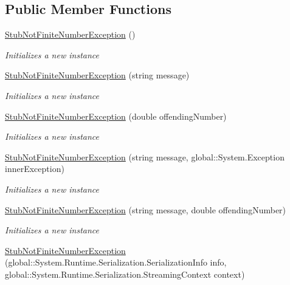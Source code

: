 \subsection*{Public Member Functions}
\begin{DoxyCompactItemize}
\item 
\hyperlink{class_system_1_1_fakes_1_1_stub_not_finite_number_exception_ab3930f89619adac6dda3f187da717ad2}{Stub\-Not\-Finite\-Number\-Exception} ()
\begin{DoxyCompactList}\small\item\em Initializes a new instance\end{DoxyCompactList}\item 
\hyperlink{class_system_1_1_fakes_1_1_stub_not_finite_number_exception_af82b0e090c0856cd54d815d9a77ff36d}{Stub\-Not\-Finite\-Number\-Exception} (string message)
\begin{DoxyCompactList}\small\item\em Initializes a new instance\end{DoxyCompactList}\item 
\hyperlink{class_system_1_1_fakes_1_1_stub_not_finite_number_exception_a13aff580c7004d779815601e4f2d7957}{Stub\-Not\-Finite\-Number\-Exception} (double offending\-Number)
\begin{DoxyCompactList}\small\item\em Initializes a new instance\end{DoxyCompactList}\item 
\hyperlink{class_system_1_1_fakes_1_1_stub_not_finite_number_exception_a433df4c360d0126d39018067ad16d476}{Stub\-Not\-Finite\-Number\-Exception} (string message, global\-::\-System.\-Exception inner\-Exception)
\begin{DoxyCompactList}\small\item\em Initializes a new instance\end{DoxyCompactList}\item 
\hyperlink{class_system_1_1_fakes_1_1_stub_not_finite_number_exception_a3db7fc4934a20dd93ff77b54cda4824d}{Stub\-Not\-Finite\-Number\-Exception} (string message, double offending\-Number)
\begin{DoxyCompactList}\small\item\em Initializes a new instance\end{DoxyCompactList}\item 
\hyperlink{class_system_1_1_fakes_1_1_stub_not_finite_number_exception_ab5c9126786e3df93ccb7db654465acf7}{Stub\-Not\-Finite\-Number\-Exception} (global\-::\-System.\-Runtime.\-Serialization.\-Serialization\-Info info, global\-::\-System.\-Runtime.\-Serialization.\-Streaming\-Context context)

\end{DoxyCompactItemize}
